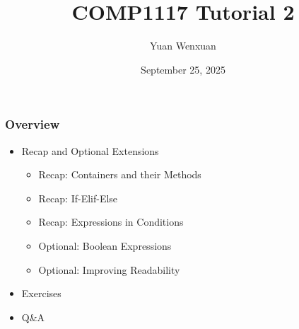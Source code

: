 \documentclass{beamer}
\title{COMP1117 Tutorial 2}
\author{Yuan Wenxuan}
\date{September 25, 2025}
\begin{document}
\frame{\titlepage}

\begin{frame}
    \frametitle{Overview}
    \begin{itemize}
        \item Recap and Optional Extensions
              \begin{itemize}
                  \item Recap: Containers and their Methods
                  \item Recap: If-Elif-Else
                  \item Recap: Expressions in Conditions
                  \item Optional: Boolean Expressions
                  \item Optional: Improving Readability
              \end{itemize}
        \item Exercises
        \item Q\&A
    \end{itemize}
\end{frame}
\end{document}
